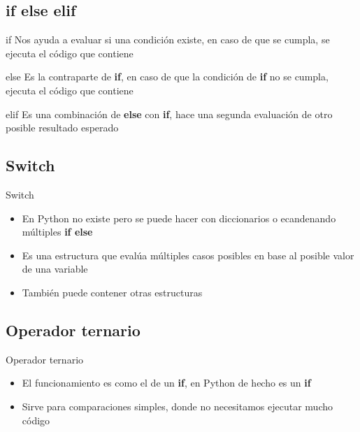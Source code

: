 \documentclass{beamer}
\begin{document}
\subsection{if else elif}

\begin{frame}{if}
    Nos ayuda a evaluar si una condici\'on existe, en caso de que se cumpla, se ejecuta el c\'odigo que contiene
\end{frame}

\begin{frame}{else}
    Es la contraparte de \textbf{if}, en caso de que la condici\'on de \textbf{if} no se cumpla, ejecuta el c\'odigo que contiene
\end{frame}

\begin{frame}{elif}
    Es una combinaci\'on de \textbf{else} con \textbf{if}, hace una segunda evaluaci\'on de otro posible resultado esperado
\end{frame}

\subsection{Switch}

\begin{frame}{Switch}
    \begin{itemize}
        \item En Python no existe pero se puede hacer con diccionarios o ecandenando m\'ultiples \textbf{if else}
        \item Es una estructura que eval\'ua m\'ultiples casos posibles en base al posible valor de una variable
        \item Tambi\'en puede contener otras estructuras
    \end{itemize}
\end{frame}

\subsection{Operador ternario}

\begin{frame}{Operador ternario}
    \begin{itemize}
        \item El funcionamiento es como el de un \textbf{if}, en Python de hecho es un \textbf{if}
        \item Sirve para comparaciones simples, donde no necesitamos ejecutar mucho c\'odigo
    \end{itemize}
\end{frame}
\end{document}
